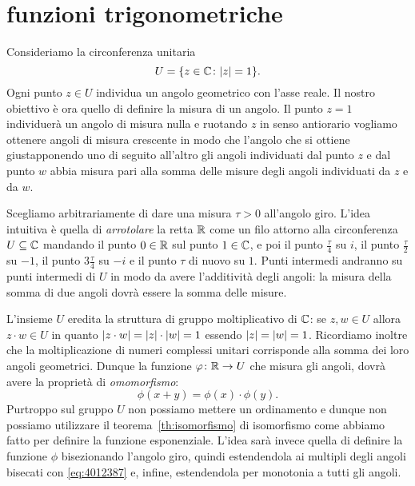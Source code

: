 \section{funzioni trigonometriche}
\label{sec:funzioni_trigonometriche}%
\label{sec:avvolgimento}%

Consideriamo la circonferenza unitaria 
\[
  U = {\left\{ z\in {\mathbb C}\colon {\left|z\right|} = 1 \right\}}.
\]
Ogni punto $z\in U$ individua un angolo geometrico con l'asse reale.
Il nostro obiettivo è ora quello di definire la misura di un angolo.
Il punto $z=1$ individuerà un angolo di misura nulla e 
ruotando $z$ in senso antiorario vogliamo ottenere angoli 
di misura crescente in modo che l'angolo che si ottiene 
giustapponendo uno di seguito all'altro gli angoli individuati 
dal punto $z$ e dal punto $w$ abbia misura pari alla somma delle misure 
degli angoli individuati da $z$ e da $w$.

Scegliamo arbitrariamente di dare una misura $\tau>0$ all'angolo giro.
L'idea intuitiva è quella di \emph{arrotolare} la retta ${\mathbb R}$ come un filo 
attorno alla circonferenza $U\subseteq {\mathbb C}$ 
mandando il punto $0\in {\mathbb R}$ sul punto $1\in {\mathbb C}$,
e poi il punto $\frac \tau 4$ su $i$, il punto $\frac \tau 2$ su $-1$,
il punto $3\frac \tau 4$ su $-i$ e il punto $\tau$ di nuovo su $1$.
Punti intermedi andranno su punti intermedi di $U$ in modo da avere 
l'additività degli angoli: la misura della somma di due angoli dovrà 
essere la somma delle misure.

L'insieme $U$ eredita la struttura di gruppo moltiplicativo di ${\mathbb C}$: 
se $z,w\in U$ 
allora $z\cdot w \in U$ in quanto ${\left|z\cdot w\right|} = {\left|z\right|}\cdot {\left|w\right|} = 1$
essendo ${\left|z\right|}={\left|w\right|}=1$.
Ricordiamo inoltre che la moltiplicazione di numeri complessi unitari 
corrisponde alla somma dei loro angoli geometrici.
Dunque la funzione $\varphi\colon {\mathbb R} \to U$ che misura gli angoli, 
dovrà avere la proprietà di \emph{omomorfismo}:
\begin{equation}\label{eq:4012387}
  \phi(x+y) = \phi(x)\cdot \phi(y).
\end{equation}
Purtroppo sul gruppo $U$ non possiamo mettere un ordinamento e 
dunque non possiamo utilizzare il teorema~\ref{th:isomorfismo} 
di isomorfismo 
come abbiamo fatto per definire la funzione esponenziale.
L'idea sarà invece quella di definire la funzione $\phi$ 
bisezionando l'angolo giro, quindi estendendola ai multipli 
degli angoli bisecati con \eqref{eq:4012387}
e, infine, estendendola per monotonia a tutti gli angoli.

